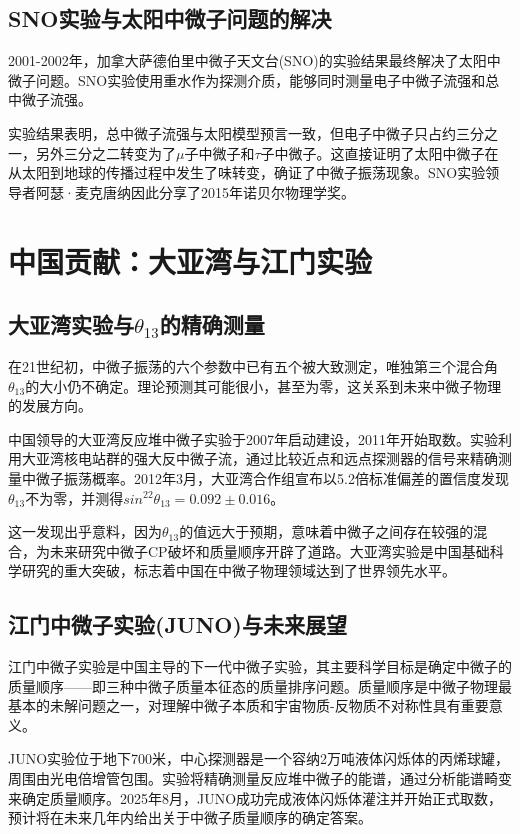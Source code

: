 \documentclass[12pt, a4paper]{article}
\begin{document}
\subsection{SNO实验与太阳中微子问题的解决}
2001-2002年，加拿大萨德伯里中微子天文台(SNO)的实验结果最终解决了太阳中微子问题。SNO实验使用重水作为探测介质，能够同时测量电子中微子流强和总中微子流强。

实验结果表明，总中微子流强与太阳模型预言一致，但电子中微子只占约三分之一，另外三分之二转变为了$\mu$子中微子和$\tau$子中微子。这直接证明了太阳中微子在从太阳到地球的传播过程中发生了味转变，确证了中微子振荡现象。SNO实验领导者阿瑟·麦克唐纳因此分享了2015年诺贝尔物理学奖。

\section{中国贡献：大亚湾与江门实验}
\subsection{大亚湾实验与$\theta_{13}$的精确测量}
在21世纪初，中微子振荡的六个参数中已有五个被大致测定，唯独第三个混合角$\theta_{13}$的大小仍不确定。理论预测其可能很小，甚至为零，这关系到未来中微子物理的发展方向。

中国领导的大亚湾反应堆中微子实验于2007年启动建设，2011年开始取数。实验利用大亚湾核电站群的强大反中微子流，通过比较近点和远点探测器的信号来精确测量中微子振荡概率。2012年3月，大亚湾合作组宣布以5.2倍标准偏差的置信度发现$\theta_{13}$不为零，并测得$sin^22\theta_{13}=0.092\pm 0.016$。

这一发现出乎意料，因为$\theta_{13}$的值远大于预期，意味着中微子之间存在较强的混合，为未来研究中微子CP破坏和质量顺序开辟了道路。大亚湾实验是中国基础科学研究的重大突破，标志着中国在中微子物理领域达到了世界领先水平。

\subsection{江门中微子实验(JUNO)与未来展望}
江门中微子实验是中国主导的下一代中微子实验，其主要科学目标是确定中微子的质量顺序——即三种中微子质量本征态的质量排序问题。质量顺序是中微子物理最基本的未解问题之一，对理解中微子本质和宇宙物质-反物质不对称性具有重要意义。

JUNO实验位于地下700米，中心探测器是一个容纳2万吨液体闪烁体的丙烯球罐，周围由光电倍增管包围。实验将精确测量反应堆中微子的能谱，通过分析能谱畸变来确定质量顺序。2025年8月，JUNO成功完成液体闪烁体灌注并开始正式取数，预计将在未来几年内给出关于中微子质量顺序的确定答案。
\end{document}
